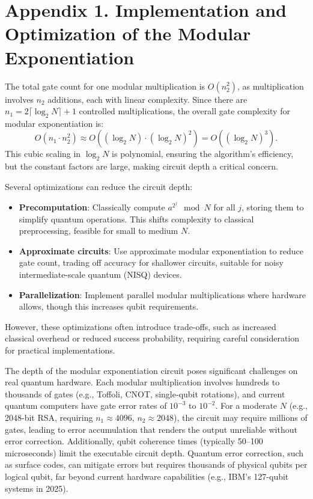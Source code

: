 \documentclass[conference,twoside]{IEEEtran}
\begin{document}
\section*{Appendix 1. Implementation and Optimization of the Modular Exponentiation}
The total gate count for one modular multiplication is \( O(n_2^2) \), as multiplication involves \( n_2 \) additions, each with linear complexity. Since there are \( n_1 = 2 \lceil \log_2 N \rceil  + 1\) controlled multiplications, the overall gate complexity for modular exponentiation is:
\begin{equation}
O(n_1 \cdot n_2^2) \approx O((\log_2 N) \cdot (\log_2 N)^2) = O((\log_2 N)^3).
\end{equation}
This cubic scaling in \( \log_2 N \) is polynomial, ensuring the algorithm's efficiency, but the constant factors are large, making circuit depth a critical concern.

Several optimizations can reduce the circuit depth:
\begin{itemize}
    \item \textbf{Precomputation}: Classically compute \( a^{2^j} \mod N \) for all \( j \), storing them to simplify quantum operations. This shifts complexity to classical preprocessing, feasible for small to medium \( N \).
    \item \textbf{Approximate circuits}: Use approximate modular exponentiation to reduce gate count, trading off accuracy for shallower circuits, suitable for noisy intermediate-scale quantum (NISQ) devices.
    \item \textbf{Parallelization}: Implement parallel modular multiplications where hardware allows, though this increases qubit requirements.
\end{itemize}
However, these optimizations often introduce trade-offs, such as increased classical overhead or reduced success probability, requiring careful consideration for practical implementations.

The depth of the modular exponentiation circuit poses significant challenges on real quantum hardware. Each modular multiplication involves hundreds to thousands of gates (e.g., Toffoli, CNOT, single-qubit rotations), and current quantum computers have gate error rates of \( 10^{-3} \) to \( 10^{-2} \). For a moderate \( N \) (e.g., 2048-bit RSA, requiring \( n_1 \approx 4096 \), \( n_2 \approx 2048 \)), the circuit may require millions of gates, leading to error accumulation that renders the output unreliable without error correction. Additionally, qubit coherence times (typically 50–100 microseconds) limit the executable circuit depth. Quantum error correction, such as surface codes, can mitigate errors but requires thousands of physical qubits per logical qubit, far beyond current hardware capabilities (e.g., IBM’s 127-qubit systems in 2025).
\end{document}

